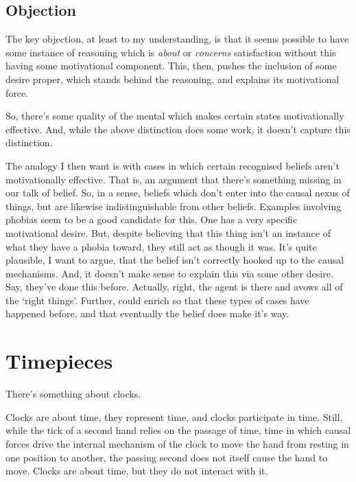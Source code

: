 \documentclass[10pt]{article}
\begin{document}
\subsection{Objection}
\label{sec:objection}

The key objection, at least to my understanding, is that it seems possible to have some instance of reasoning which is \emph{about} or \emph{concerns} satisfaction without this having some motivational component.
This, then, pushes the inclusion of some desire proper, which stands behind the reasoning, and explains its motivational force.

So, there's some quality of the mental which makes certain states motivationally effective.
And, while the above distinction does some work, it doesn't capture this distinction.

The analogy I then want is with cases in which certain recognised beliefs aren't motivationally effective.
That is, an argument that there's something missing in our talk of belief.
So, in a sense, beliefs which don't enter into the causal nexus of things, but are likewise indistinguishable from other beliefs.
Examples involving phobias seem to be a good candidate for this.
One has a very specific motivational desire.
But, despite believing that this thing isn't an instance of what they have a phobia toward, they still act as though it was.
It's quite plausible, I want to argue, that the belief isn't correctly hooked up to the causal mechanisms.
And, it doesn't make sense to explain this via some other desire.
Say, they've done this before.
Actually, right, the agent is there and avows all of the `right things'.
Further, could enrich so that these types of cases have happened before, and that eventually the belief does make it's way.




\section{Timepieces}
\label{sec:timepieces}

There's something about clocks.

Clocks are about time, they represent time, and clocks participate in time.
Still, while the tick of a second hand relies on the passage of time, time in which causal forces drive the internal mechanism of the clock to move the hand from resting in one position to another, the passing second does not itself cause the hand to move.
Clocks are about time, but they do not interact with it.
\end{document}
